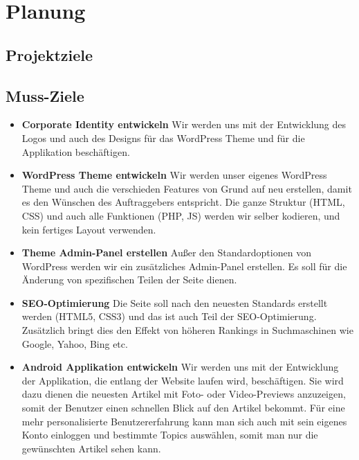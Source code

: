 \chapter{Planung}
\section{Projektziele}

\section*{Muss-Ziele}
\begin{itemize}

\item \textbf{Corporate Identity entwickeln}\newline
Wir werden uns mit der Entwicklung des Logos und auch des Designs für das WordPress Theme und für die Applikation beschäftigen.

\item \textbf{WordPress Theme entwickeln}\newline
Wir werden unser eigenes WordPress Theme und auch die verschieden Features von Grund auf neu erstellen, damit es den Wünschen des Auftraggebers entspricht. Die ganze Struktur (HTML, CSS) und auch alle Funktionen (PHP, JS) werden wir selber kodieren, und kein fertiges Layout verwenden.

\item \textbf{Theme Admin-Panel erstellen}\newline
Außer den Standardoptionen von WordPress werden wir ein zusätzliches Admin-Panel erstellen. Es soll für die Änderung von spezifischen Teilen der Seite dienen.

\item \textbf{SEO-Optimierung}\newline
Die Seite soll nach den neuesten Standards erstellt werden (HTML5, CSS3) und das ist auch Teil der SEO-Optimierung. Zusätzlich bringt dies den Effekt von höheren Rankings in Suchmaschinen wie Google, Yahoo, Bing etc.

\item \textbf{Android Applikation entwickeln}\newline
Wir werden uns mit der Entwicklung der Applikation, die entlang der Website laufen wird, beschäftigen. Sie wird dazu dienen die neuesten Artikel mit Foto- oder Video-Previews anzuzeigen, somit der Benutzer einen schnellen Blick auf den Artikel bekommt. Für eine mehr personalisierte Benutzererfahrung kann man sich auch mit sein eigenes Konto einloggen und bestimmte Topics auswählen, somit man nur die gewünschten Artikel sehen kann.


\end{itemize}
